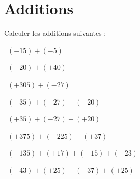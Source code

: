 
\section{Additions}

Calculer les additions suivantes :
\begin{questions}
	
	\question[1]  $(-15) + (- 5)$
	\fillwithdottedlines{1cm}
	\begin{solution}
		
	\end{solution}
	
	\question[1]  $(-20) + (+ 40)$
	\fillwithdottedlines{1cm}
	\begin{solution}
		
	\end{solution}
	
	
	
	
	\question[1]  $(+305) + (-27)$
	\fillwithdottedlines{1cm}
	\begin{solution}
		
	\end{solution}
	
	
	\question[1]  $(-35) + (-27)  + (-20)$
	\fillwithdottedlines{1.5cm}
	\begin{solution}
		
	\end{solution}
	
	
	\question[2]  $(+35) + (-27)  + (+20)$
	\fillwithdottedlines{1.5cm}
	\begin{solution}
		
	\end{solution}
	
	
	
	
	\question[2]  $(+375) + (-225) + (+37)$
	\fillwithdottedlines{1.5cm}
	\begin{solution}
		
	\end{solution}
	
	
	\question[2]  $(-135) + (+17) + (+15) + (-23)$ 
	\fillwithdottedlines{2cm}
	\begin{solution}
		
	\end{solution}
	
	
	\question[2]  $(-43) + (+25) + (-37) + (+25)$ 
	\fillwithdottedlines{2cm}
	\begin{solution}
		
	\end{solution}
\end{questions}

